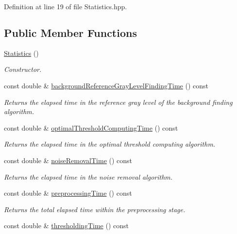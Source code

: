 Definition at line 19 of file Statistics.hpp.\subsection*{Public Member Functions}
\begin{CompactItemize}
\item 
\hyperlink{class_statistics_60ddd90a571ed4c3ce8c0f6317a36d63}{Statistics} ()
\begin{CompactList}\small\item\em Constructor. \item\end{CompactList}\item 
const double \& \hyperlink{class_statistics_d70a464a72d94c795097608e2a18550a}{backgroundReferenceGrayLevelFindingTime} () const 
\begin{CompactList}\small\item\em Returns the elapsed time in the reference gray level of the background finding algorithm. \item\end{CompactList}\item 
const double \& \hyperlink{class_statistics_87bdb5b4f7a88cb74d0072fd0c7a2248}{optimalThresholdComputingTime} () const 
\begin{CompactList}\small\item\em Returns the elapsed time in the optimal threshold computing algorithm. \item\end{CompactList}\item 
const double \& \hyperlink{class_statistics_ba44f1b2567a77f99ee15c11bda6312a}{noiseRemovalTime} () const 
\begin{CompactList}\small\item\em Returns the elapsed time in the noise removal algorithm. \item\end{CompactList}\item 
const double \& \hyperlink{class_statistics_9b1c2d1f1338069346c80293a2c11b6d}{preprocessingTime} () const 
\begin{CompactList}\small\item\em Returns the total elapsed time within the preprocessing stage. \item\end{CompactList}\item 
const double \& \hyperlink{class_statistics_51a8c70011a201873db8f388dad733ac}{thresholdingTime} () const 

\end{CompactItemize}
